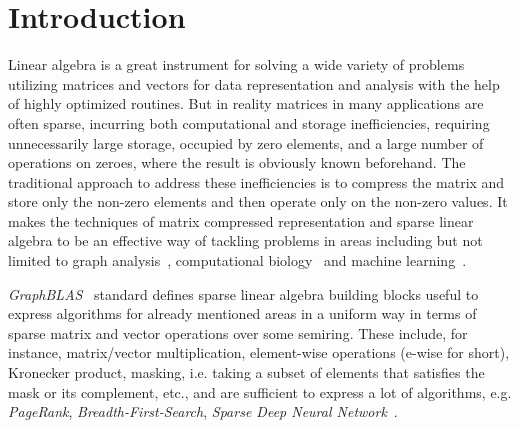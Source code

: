 \documentclass[10pt,conference]{IEEEtran}
\begin{document}
\section*{Introduction}


Linear algebra is a great instrument for solving a wide variety of problems utilizing matrices and vectors for data representation and analysis with the help of highly optimized routines.
But in reality matrices in many applications are often sparse, incurring both computational and storage inefficiencies, requiring unnecessarily large storage, occupied by zero elements, and a large number of operations on zeroes, where the result is obviously known beforehand. 
The traditional approach to address these inefficiencies is to compress the matrix and store only the non-zero elements and then operate only on the non-zero values.
It makes the techniques of matrix compressed representation and sparse linear algebra to be an effective way of tackling problems in areas including but not limited to graph analysis~\cite{GAILLA}, computational biology~\cite{compBio} and machine learning~\cite{Kepner_2017}.



\emph{GraphBLAS}~\cite{buluc2017graphblas} standard defines sparse linear algebra building blocks useful to express algorithms for already mentioned areas in a uniform way in terms of sparse matrix and vector operations over some semiring.
These include, for instance, matrix/vector multiplication, element-wise operations (e-wise for short), Kronecker product, masking, i.e. taking a subset of elements that satisfies the mask or its complement, etc., and are sufficient to express a lot of algorithms, e.g. \emph{PageRank}, \emph{Breadth-First-Search}, \emph{Sparse Deep Neural Network}~\cite{SparseDNN}.
\end{document}
